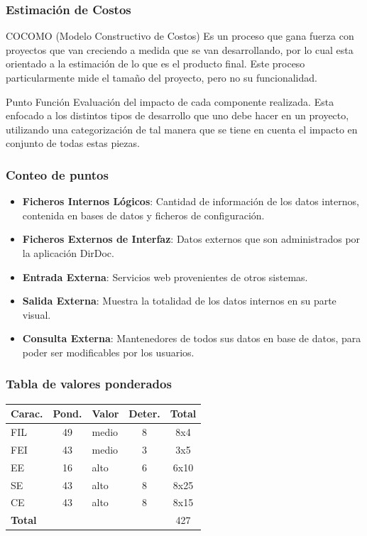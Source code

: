 \documentclass{beamer}
\begin{document}

\begin{frame}
\frametitle{Estimación de Costos}
\begin{block}{COCOMO (Modelo Constructivo de Costos)}
Es un proceso que gana fuerza con proyectos que van creciendo a medida que se van desarrollando, por lo cual esta orientado a la estimación de lo que es el producto final. Este proceso particularmente mide el tamaño del proyecto, pero no su funcionalidad.
\end{block}
\begin{block}{Punto Función}
Evaluación del impacto de cada componente realizada. Esta enfocado a los distintos tipos de desarrollo que uno debe hacer en un proyecto, utilizando una categorización de tal manera que se tiene en cuenta el impacto en conjunto de todas estas piezas.
\end{block}
\end{frame}


\begin{frame}
\frametitle{Conteo de puntos}
\begin{itemize}
\item \textbf{Ficheros Internos Lógicos}: Cantidad de información de los datos internos, contenida en bases de datos y ficheros de configuración.
\item \textbf{Ficheros Externos de Interfaz}: Datos externos que son administrados por la aplicación DirDoc.
\item \textbf{Entrada Externa}: Servicios web provenientes de otros sistemas.
\item \textbf{Salida Externa}: Muestra la totalidad de los datos internos en su parte visual.
\item \textbf{Consulta Externa}: Mantenedores de todos sus datos en base de datos, para poder ser modificables por los usuarios.
\end{itemize}
\end{frame}


\begin{frame}
\frametitle{Tabla de valores ponderados}
\begin{table}
\begin{tabular}{l c l c c}
\toprule
\textbf{Carac.} & \textbf{Pond.} & \textbf{Valor} & \textbf{Deter.} & \textbf{Total}\\
\midrule
FIL & 49 & medio & 8 & 8x4 \\
FEI	& 43 & medio & 3 &  3x5\\
EE 	& 16 & alto  & 6 &  6x10\\
SE 	& 43 & alto  & 8 &  8x25\\
CE	& 43 & alto  & 8 &  8x15\\
\textbf{Total} &&&   &  427\\
\bottomrule
\end{tabular}
\end{table}
\end{frame}
\end{document}
